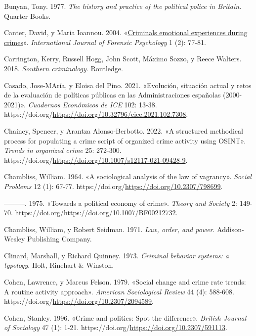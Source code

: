 \documentclass[
  spanish,
  letterpaper,
  DIV=11,
  numbers=noendperiod]{scrreprt}
\newlength{\cslhangindent}
\newenvironment{CSLReferences}[2] %
 {\begin{list}{}{%
  \setlength{\itemindent}{0pt}
  \setlength{\leftmargin}{0pt}
  \setlength{\parsep}{0pt}
  \ifodd #1
   \setlength{\leftmargin}{\cslhangindent}
   \setlength{\itemindent}{-1\cslhangindent}
  \fi
  \setlength{\itemsep}{#2\baselineskip}}}
 {\end{list}}
\begin{document}
\begin{CSLReferences}{1}{0}
Bunyan, Tony. 1977. \emph{The history and practice of the political
police in Britain}. Quarter Books.

Canter, David, y Maria Ioannou. 2004. {«\href{}{Criminals emotional
experiences during crimes}»}. \emph{International Journal of Forensic
Psychology} 1 (2): 77-81.

Carrington, Kerry, Russell Hogg, John Scott, Máximo Sozzo, y Reece
Walters. 2018. \emph{Southern criminology}. Routledge.

Casado, Jose-MAría, y Eloisa del Pino. 2021. {«Evolución, situación
actual y retos de la evaluación de políticas públicas en las
Administraciones españolas (2000-2021)»}. \emph{Cuadernos Económicos de
ICE} 102: 13-38.
https://doi.org/\url{https://doi.org/10.32796/cice.2021.102.7308}.

Chainey, Spencer, y Arantza Alonso-Berbotto. 2022. {«A structured
methodical process for populating a crime script of organized crime
activity using OSINT»}. \emph{Trends in organized crime} 25: 272-300.
https://doi.org/\url{https://doi.org/10.1007/s12117-021-09428-9}.

Chambliss, William. 1964. {«A sociological analysis of the law of
vagrancy»}. \emph{Social Problems} 12 (1): 67-77.
https://doi.org/\url{https://doi.org/10.2307/798699}.

---------. 1975. {«Towards a political economy of crime»}. \emph{Theory
and Society} 2: 149-70.
https://doi.org/\url{https://doi.org/10.1007/BF00212732}.

Chambliss, William, y Robert Seidman. 1971. \emph{Law, order, and
power}. Addison-Wesley Publishing Company.

Clinard, Marshall, y Richard Quinney. 1973. \emph{Criminal behavior
systems: a typology}. Holt, Rinehart \& Winston.

Cohen, Lawrence, y Marcus Felson. 1979. {«Social change and crime rate
trends: A routine activity approach»}. \emph{American Sociological
Review} 44 (4): 588-608.
https://doi.org/\url{https://doi.org/10.2307/2094589}.

Cohen, Stanley. 1996. {«Crime and politics: Spot the difference»}.
\emph{British Journal of Sociology} 47 (1): 1-21.
https://doi.org/\url{https://doi.org/10.2307/591113}.


\end{CSLReferences}
\end{document}
